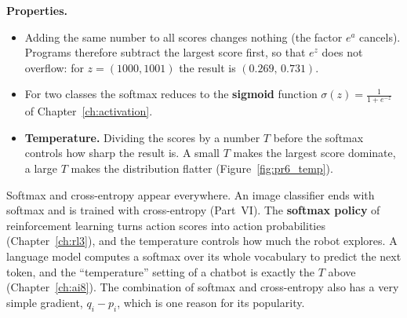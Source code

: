 \textbf{Properties.}
\begin{itemize}[nosep]
  \item Adding the same number to all scores changes nothing (the factor $e^{a}$ cancels). Programs therefore subtract the largest score first, so that $e^{z}$ does not overflow: for $z=(1000,1001)$ the result is $(0.269,\,0.731)$.
  \item For two classes the softmax reduces to the \textbf{sigmoid} function $\sigma(z)=\frac1{1+e^{-z}}$ of Chapter~\ref{ch:activation}.
  \item \textbf{Temperature.} Dividing the scores by a number $T$ before the softmax controls how sharp the result is. A small $T$ makes the largest score dominate, a large $T$ makes the distribution flatter (Figure~\ref{fig:pr6_temp}).
\end{itemize}

\begin{center}
\label{fig:pr6_temp}
\end{center}

\begin{aibox}
Softmax and cross-entropy appear everywhere. An image classifier ends with softmax and is trained with cross-entropy (Part~VI). The \textbf{softmax policy} of reinforcement learning turns action scores into action probabilities (Chapter~\ref{ch:rl3}), and the temperature controls how much the robot explores. A language model computes a softmax over its whole vocabulary to predict the next token, and the ``temperature'' setting of a chatbot is exactly the $T$ above (Chapter~\ref{ch:ai8}). The combination of softmax and cross-entropy also has a very simple gradient, $q_i-p_i$, which is one reason for its popularity.
\end{aibox}

